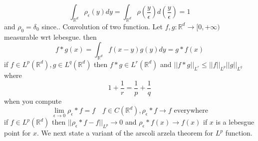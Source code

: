 \documentclass[11pt]{article}
\begin{document}
\[
\int_{ \mathbb{R}^{d}}^{} \rho_\epsilon(y)dy = \int_{ \mathbb{R}^{d}}^{} \rho(\frac{y}{\epsilon}) d(\frac{y}{\epsilon}) = 1
\] 
and $\rho_0 = \delta_0$ since..
Convolution of two function. Let $f,g : \mathbb{R}^{d} \rightarrow [0,+\infty)$ measurable wrt lebesgue.
then
\[
f * g(x) = \int_{ \mathbb{R}^{d}}^{}f(x-y)g(y)dy = g * f(x)
\] 
if $f \in L^{p}( \mathbb{R}^{d}), g \in L^{q}( \mathbb{R}^{d})$ then $f * g \in L^{r} ( \mathbb{R}^{d})$ and $||f * g||_{L^{r}} \le ||f||_{L^{p}} ||g||_{L^{q}}$ where
\[
1 + \frac{1}{r} = \frac{1}{p} + \frac{1}{q}
\] 
when you compute
\[
    \lim_{\epsilon\to 0 } \rho_\epsilon * f = f \quad f \in C( \mathbb{R}^{d}), \rho_\epsilon * f \rightarrow f \text{ everywhere}
\] 
if $f \in L^{p} (  \mathbb{R}^{d})$ then $||\rho_\epsilon * f - f||_{L^{p}} \rightarrow 0$ and $\rho_\epsilon * f(x) \rightarrow f(x)$ if $x$ is a lebesgue point for  $x$.
We next state a variant of the arscoli arzela theorem for  $L^p$ function.
\end{document}
